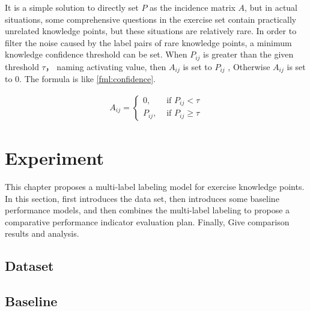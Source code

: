 It is a simple solution to directly set $P$ as the incidence matrix $A$, but in actual situations, some comprehensive questions in the exercise set contain practically unrelated knowledge points, but these situations are relatively rare. In order to filter the noise caused by the label pairs of rare knowledge points, a minimum knowledge confidence threshold can be set. When $P_{ij}$ is greater than the given threshold \(\tau\)， naming activating value, then \(A_{ij}\) is set to $P_{ij}$ , Otherwise $A_{ij}$ is set to 0. The formula is like \ref{fml:confidence}.

\begin{align}
	A_{i j}=\left\{\begin{array}{ll}
		0,      & \text { if } P_{i j}<\tau      \\
		P_{ij}, & \text { if } P_{i j} \geq \tau
	\end{array}\right.\label{fml:confidence}
\end{align}

\section{Experiment}
This chapter proposes a multi-label labeling model for exercise knowledge points. In this section, first introduces the data set, then introduces some baseline performance models, and then combines the multi-label labeling to propose a comparative performance indicator evaluation plan. Finally, Give comparison results and analysis.
\subsection{Dataset}

\subsection{Baseline}
% 


